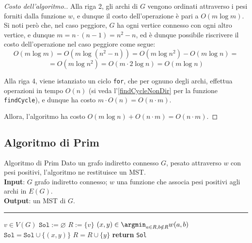 \documentclass[a4paper, 12pt]{report}
\begin{document}
    \begin{proof}[Costo dell'algoritmo.]
        Alla riga 2, gli archi di $G$ vengono ordinati attraverso i pesi forniti dalla funzione $w$, e dunque il costo dell'operazione è pari a $O(m \log m)$. Si noti però che, nel caso peggiore, $G$ ha ogni vertice connesso con ogni altro vertice, e dunque $m = n\cdot ( n - 1) = n^2 - n$, ed è dunque possibile riscrivere il costo dell'operazione nel caso peggiore come segue: $$O (m \log m) = O(m \log (n^2 - n)) = O(m \log n^2) - O(m \log n) =$$ $$= O(m \log n^2) = O(m \cdot 2 \log n) = O(m \log n)$$

        Alla riga 4, viene istanziato un ciclo \texttt{for}, che per ognuno degli archi, effettua operazioni in tempo $O(n)$ (si veda l'\cref{findCycleNonDir} per la funzione \texttt{findCycle}), e dunque ha costo $m \cdot O(n) = O(n \cdot m)$.

        Allora, l'algoritmo ha costo $O(m \log n) + O(n \cdot m) = O(n \cdot m)$.
    \end{proof}

    \subsection{Algoritmo di Prim}

    \begin{framedalgo}{Algoritmo di Prim}
        Dato un grafo indiretto connesso $G$, pesato attraverso $w$ con pesi positivi, l'algoritmo ne restituisce un MST.\\
        \textbf{Input}: $G$ grafo indiretto connesso; $w$ una funzione che associa pesi positivi agli archi in $E(G)$.\\
        \textbf{Output}: un MST di $G$.

        \hrule
        \begin{algorithmic}[1]
                \State $v \in V(G)$
                \State $\texttt{Sol} := \varnothing$
                \State $R := \{v\}$
                    \State $\displaystyle (x, y) \in \argmin_{a \in R, b \notin R} {w(a, b)}$
                    \State $\texttt{Sol} = \texttt{Sol} \cup \{ (x, y) \}$
                    \State $R = R \cup \{y\}$
                \EndWhile
                \State \textbf{return} \texttt{Sol}
            \EndFunction
        \end{algorithmic}
    \end{framedalgo}
\end{document}
